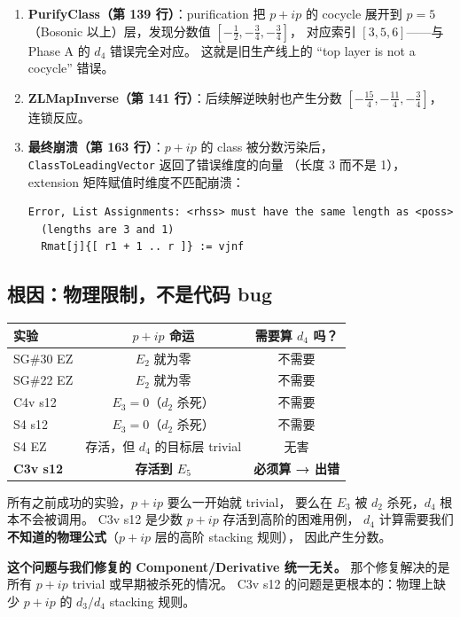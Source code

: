 \documentclass[a4paper,fontset=ubuntu,12pt]{ctexart}
\begin{document}
\begin{enumerate}
\item \textbf{PurifyClass（第 139 行）}：purification 把 $p{+}ip$ 的 cocycle 展开到
      $p=5$（Bosonic 以上）层，发现分数值 $[-\frac{1}{2}, -\frac{3}{4}, -\frac{3}{4}]$，
      对应索引 $[3,5,6]$——与 Phase A 的 $d_4$ 错误完全对应。
      这就是旧生产线上的 ``top layer is not a cocycle'' 错误。
\item \textbf{ZLMapInverse（第 141 行）}：后续解逆映射也产生分数
      $[-\frac{15}{4}, -\frac{11}{4}, -\frac{3}{4}]$，连锁反应。
\item \textbf{最终崩溃（第 163 行）}：$p{+}ip$ 的 class 被分数污染后，
      \texttt{ClassToLeadingVector} 返回了错误维度的向量
      （长度 3 而不是 1），extension 矩阵赋值时维度不匹配崩溃：
\begin{verbatim}
Error, List Assignments: <rhss> must have the same length as <poss>
  (lengths are 3 and 1)
  Rmat[j]{[ r1 + 1 .. r ]} := vjnf
\end{verbatim}
\end{enumerate}

\subsection{根因：物理限制，不是代码 bug}

\begin{center}
\begin{tabular}{l|cc}
\hline
实验 & $p{+}ip$ 命运 & 需要算 $d_4$ 吗？ \\
\hline
SG\#30 EZ & $E_2$ 就为零 & 不需要 \\
SG\#22 EZ & $E_2$ 就为零 & 不需要 \\
C4v s12 & $E_3 = 0$（$d_2$ 杀死） & 不需要 \\
S4 s12 & $E_3 = 0$（$d_2$ 杀死） & 不需要 \\
S4 EZ & 存活，但 $d_4$ 的目标层 trivial & 无害 \\
\textbf{C3v s12} & \textbf{存活到 $E_5$} & \textbf{必须算 → 出错} \\
\hline
\end{tabular}
\end{center}

所有之前成功的实验，$p{+}ip$ 要么一开始就 trivial，
要么在 $E_3$ 被 $d_2$ 杀死，$d_4$ 根本不会被调用。
C3v s12 是少数 $p{+}ip$ 存活到高阶的困难用例，
$d_4$ 计算需要我们\textbf{不知道的物理公式}（$p{+}ip$ 层的高阶 stacking 规则），
因此产生分数。

\textbf{这个问题与我们修复的 Component/Derivative 统一无关。}
那个修复解决的是所有 $p{+}ip$ trivial 或早期被杀死的情况。
C3v s12 的问题是更根本的：物理上缺少 $p{+}ip$ 的 $d_3/d_4$ stacking 规则。
\end{document}
